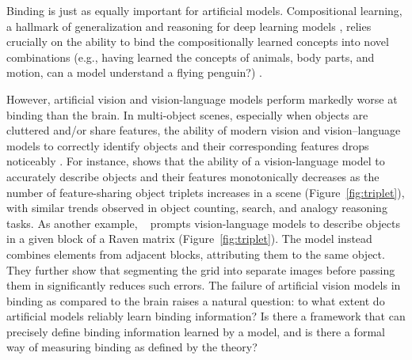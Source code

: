 \documentclass{article}
\theoremstyle{plain}
\theoremstyle{definition}
\theoremstyle{remark}
\begin{document}
Binding is just as equally important for artificial models. Compositional learning, a hallmark of generalization and reasoning for deep learning models \cite{uselis2025doesdatascalinglead, lake2018generalizationsystematicitycompositionalskills, hupkes2020compositionalitydecomposedneuralnetworks, wiedemer2023compositionalgeneralizationprinciples}, relies crucially on the ability to bind the compositionally learned concepts into novel combinations (e.g., having learned the concepts of animals, body parts, and motion, can a model understand a flying penguin?) \cite{greff2020bindingproblemartificialneural}. 

However, artificial vision and vision-language models perform markedly worse at binding than the brain. In multi-object scenes, especially when objects are cluttered and/or share features, the ability of modern vision and vision–language models to correctly identify objects and their corresponding features drops noticeably \cite{campbell2025understandinglimitsvisionlanguage, zhang2024farintelligentvisualdeductive, lewis2024doesclipbindconcepts,yuksekgonul2023visionlanguagemodelsbehavelike,assouel2025visualsymbolicmechanismsemergent}. For instance, \cite{campbell2025understandinglimitsvisionlanguage} shows that the ability of a vision-language model to accurately describe objects and their features monotonically decreases as the number of feature-sharing object triplets increases in a scene (Figure~\ref{fig:triplet}), with similar trends observed in object counting, search, and analogy reasoning tasks. As another example, ~\citep{zhang2024farintelligentvisualdeductive} prompts vision-language models to describe objects in a given block of a Raven matrix (Figure~\ref{fig:triplet}). The model instead combines elements from adjacent blocks, attributing them to the same object. They further show that segmenting the grid into separate images before passing them in significantly reduces such errors. The failure of artificial vision models in binding as compared to the brain raises a natural question: to what extent do artificial models reliably learn binding information? Is there a framework that can precisely define binding information learned by a model, and is there a formal way of measuring binding as defined by the theory?
\end{document}
